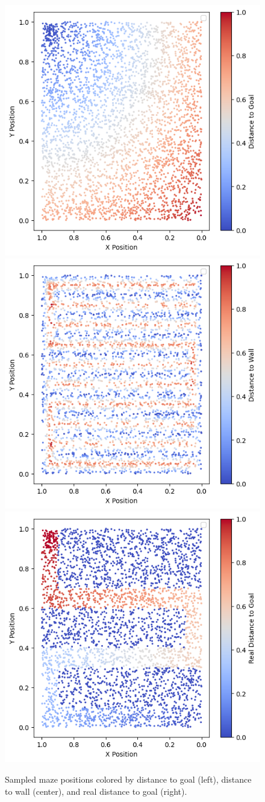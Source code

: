 \documentclass[a4paper,oneside,10pt,ngerman,english]{scrartcl}
\begin{document}
\begin{figure}[h!]
  \centering
  \includegraphics[width=0.32\linewidth]{jku-templates-report-latex-master/images/distance_to_goal.png}
  \includegraphics[width=0.32\linewidth]{jku-templates-report-latex-master/images/distance_to_wall.png}
  \includegraphics[width=0.32\linewidth]{jku-templates-report-latex-master/images/distance_real.png}
  \caption{Sampled maze positions colored by distance to goal (left), distance to wall (center), and real distance to goal (right).}
  \label{fig:maze_params1}
\end{figure}
\end{document}
